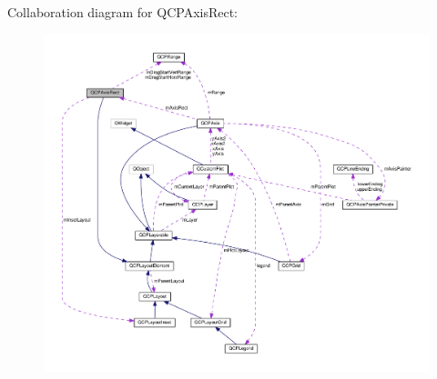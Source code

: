 Collaboration diagram for Q\+C\+P\+Axis\+Rect\+:
\nopagebreak
\begin{figure}[H]
\begin{center}
\leavevmode
\includegraphics[width=350pt]{classQCPAxisRect__coll__graph}
\end{center}
\end{figure}
